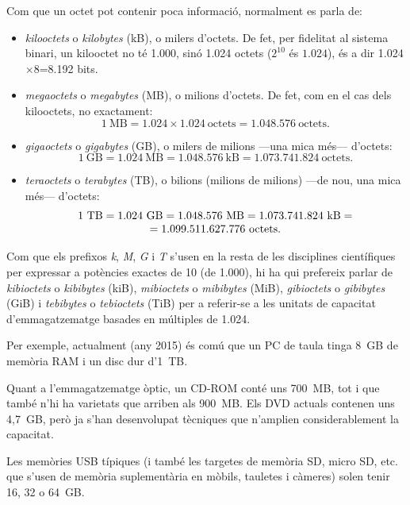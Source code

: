Com que un octet pot contenir poca informació, normalment
es parla de:
\begin{itemize}
\item \emph{kilooctets} o \emph{kilobytes} (kB), o milers d'octets.
  De fet, per fidelitat al sistema binari, un kilooctet no té
  1.000, sinó 1.024 octets ($2^{10}$ és $1.024$), és a dir
  1.024$\times$8=8.192 bits.
\item \emph{megaoctets} o  \emph{megabytes} (MB), o milions d'octets.
De fet, com en el cas dels kilooctets, no exactament:
$$1~\mbox{MB} = 1.024 \times 1.024~\mbox{octets}= 1.048.576~\mbox{octets}.$$
\item \emph{gigaoctets} o \emph{gigabytes} (GB), o milers de milions ---una mica més---
d'octets:
$$1~\mbox{GB}=1.024~\mbox{MB}=1.048.576~\mbox{kB}=1.073.741.824~\mbox{octets}.$$
\item \emph{teraoctets} o \emph{terabytes} (TB), o bilions (milions de milions) ---de nou, una mica més---
d'octets:
\[
\begin{array}{c}
$$1~\mbox{TB}=1.024~\mbox{GB}=1.048.576~\mbox{MB}=1.073.741.824~\mbox{kB}=\\
=1.099.511.627.776~\mbox{octets}.$$
\end{array}
\]
\end{itemize}
Com que els prefixos \emph{k}, \emph{M}, \emph{G} i \emph{T} s'usen en la resta de les disciplines científiques per expressar a potències exactes de 10 (de 1.000), hi ha qui prefereix parlar de \emph{kibioctets} o \emph{kibibytes} (kiB), \emph{mibioctets} o \emph{mibibytes} (MiB), \emph{gibioctets} o \emph{gibibytes} (GiB) i \emph{tebibytes} o \emph{tebioctets} (TiB) per a referir-se a les unitats de capacitat d'emmagatzematge basades en múltiples de 1.024.

Per exemple, actualment (any 2015) és comú que un PC de taula
tinga 8~GB de memòria RAM i un disc dur d'1~TB.


Quant a l'emmagatzematge òptic, un CD-ROM conté uns 700~MB, tot i
que també n'hi ha varietats que arriben als 900~MB. Els DVD actuals
contenen uns 4,7~GB, però ja s'han desenvolupat tècniques que n'amplien
considerablement la capacitat.

Les memòries USB típiques (i també les targetes de memòria SD, micro
SD, etc. que s'usen de memòria suplementària en mòbils, tauletes i
càmeres) solen tenir 16, 32 o 64~GB.
 
